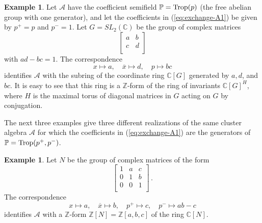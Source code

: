 \documentclass[letterpaper]{amsart}
\numberwithin{equation}{section}
\theoremstyle{definition}
\newtheorem{example}[theorem]{Example}
\def\AA{\mathcal{A}}
\def\ZZ{\mathbb{Z}}
\def\CC{\mathbb{C}}
\def\PP{\mathbb{P}}
\def\Trop{{\rm Trop}}
\newcommand{\bmat}[4]{\left[\!\!\begin{array}{cc} 
#1 & #2 \\ #3 & #4 \\ 
\end{array}\!\!\right]}
\begin{document}
\begin{example} 
\label{ex:SL2-A1} 
Let $\AA$ have the coefficient semifield $\PP = \Trop (p)$ 
(the free abelian group with one generator), 
and let the coefficients in (\ref{eq:exchange-A1}) be given 
by $p^+ = p$ and $p^- = 1$. 
Let $G = SL_2 (\CC)$ be the group of complex matrices 
$$\bmat{a}{b}{c}{d}$$ 
with $ad - bc =1$. 
The correspondence 
$$x \mapsto a, \quad \overline x \mapsto d, \quad p \mapsto bc$$ 
identifies $\AA$ with the subring of the coordinate 
ring $\CC[G]$ generated by $a, d$, and $bc$. 
It is easy to see that this ring is a $\ZZ$-form of the ring of invariants 
$\CC[G]^H$, where $H$ is the maximal torus of diagonal matrices in 
$G$ acting on $G$ by conjugation. 
\end{example} 
 
The next three examples give three different realizations of the 
same cluster algebra $\AA$ for which the coefficients in 
(\ref{eq:exchange-A1}) are the generators of $\PP = \Trop(p^+,p^-)$. 
 
\begin{example} 
\label{ex:N3-A1} 
Let $N$ be the group of complex matrices of the form 
$$\left[\!\!\begin{array}{ccc} 
1 & a & c \\ 
0 & 1 & b \\ 
0 & 0 & 1\\ 
\end{array}\!\!\right] \, .$$ 
The correspondence 
$$x \mapsto a, \quad \overline x \mapsto b, 
\quad p^+ \mapsto c, \quad p^- \mapsto ab-c$$ 
identifies $\AA$ with a $\ZZ$-form 
$\ZZ[N] = \ZZ[a,b,c]$ of the ring $\CC[N]$. 
\end{example} 
 
\end{document}
